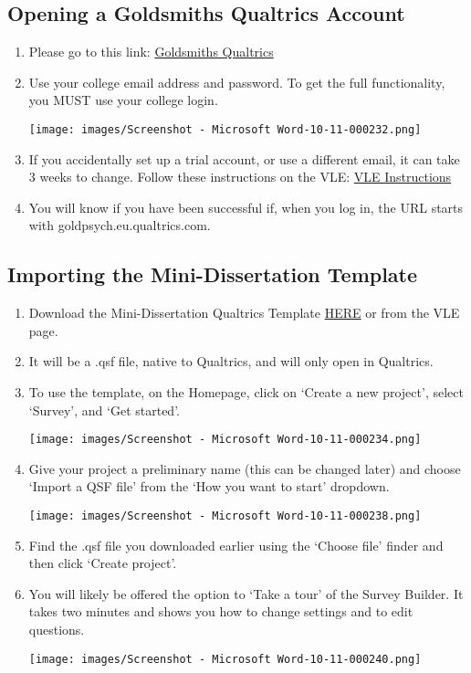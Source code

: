\documentclass[
  letterpaper,
  DIV=11,
  numbers=noendperiod]{scrartcl}
\begin{document}
\subsection{Opening a Goldsmiths Qualtrics
Account}\label{opening-a-goldsmiths-qualtrics-account}

\begin{enumerate}
\def\labelenumi{\arabic{enumi}.}
\item
  Please go to this link:
  \href{https://goldpsych.eu.qualtrics.com/}{Goldsmiths Qualtrics}
\item
  Use your college email address and password. To get the full
  functionality, you MUST use your college login.

  \texttt{[image: images/Screenshot - Microsoft Word-10-11-000232.png]}
\item
  If you accidentally set up a trial account, or use a different email,
  it can take 3 weeks to change. Follow these instructions on the VLE:
  \href{https://learn.gold.ac.uk/mod/url/view.php?id=1410095}{VLE
  Instructions}
\item
  You will know if you have been successful if, when you log in, the URL
  starts with goldpsych.eu.qualtrics.com.
\end{enumerate}

\subsection{Importing the Mini-Dissertation
Template}\label{importing-the-mini-dissertation-template}

\begin{enumerate}
\def\labelenumi{\arabic{enumi}.}
\item
  Download the Mini-Dissertation Qualtrics Template
  \href{https://learn.gold.ac.uk/mod/resource/view.php?id=1410096}{HERE}
  or from the VLE page.
\item
  It will be a .qsf file, native to Qualtrics, and will only open in
  Qualtrics.
\item
  To use the template, on the Homepage, click on `Create a new project',
  select `Survey', and `Get started'.

  \texttt{[image: images/Screenshot - Microsoft Word-10-11-000234.png]}
\item
  Give your project a preliminary name (this can be changed later) and
  choose `Import a QSF file' from the `How you want to start' dropdown.

  \texttt{[image: images/Screenshot - Microsoft Word-10-11-000238.png]}
\item
  Find the .qsf file you downloaded earlier using the `Choose file'
  finder and then click `Create project'.
\item
  You will likely be offered the option to `Take a tour' of the Survey
  Builder. It takes two minutes and shows you how to change settings and
  to edit questions.

  \texttt{[image: images/Screenshot - Microsoft Word-10-11-000240.png]}
\end{enumerate}
\end{document}
